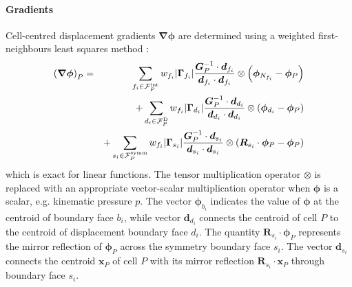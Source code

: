 \documentclass[sn-mathphys,Numbered]{sn-jnl}%
\newcommand{\bb}{\boldsymbol}
\begin{document}
\paragraph{Gradients}
Cell-centred displacement gradients $\bb{\nabla} \bb{\phi}$ are determined using a weighted first-neighbours least squares method \citep{Cardiff2025JFNK, Jasak1996}:
\begin{eqnarray} \label{eq:leastSquaresGrad}
	\left(\bb{\nabla}\bb{\phi}\right)_P
		&=&\sum_{f_i \in \mathcal{F}^{\text{int}}_P} w_{f_i} |\bb{\Gamma}_{f_i}| \frac{\bb{G}^{-1}_P \cdot \bb{d}_{f_i}}{\bb{d}_{f_i} \cdot \bb{d}_{f_i}}  \otimes \left(\bb{\phi}_{N_{f_i}} - \bb{\phi}_P \right) \notag \\
		&&+ \sum_{d_i \in \mathcal{F}^{\text{D}}_P} w_{f_i} |\bb{\Gamma}_{d_i}| \frac{ \bb{G}^{-1}_P \cdot \bb{d}_{d_i} }{\bb{d}_{d_i} \cdot \bb{d}_{d_i}} \otimes \left(\bb{\phi}_{d_i} - \bb{\phi}_P \right) \notag \\
		&&+ \sum_{s_i \in \mathcal{F}^{\text{symm}}_P} w_{f_i} |\bb{\Gamma}_{s_i}| \frac{\bb{G}^{-1}_P \cdot \bb{d}_{s_i}}{\bb{d}_{s_i} \cdot \bb{d}_{s_i}} \otimes \left(\bb{R}_{s_i} \cdot \bb{\phi}_P - \bb{\phi}_P \right)
\end{eqnarray}
which is exact for linear functions.
The tensor multiplication operator $\otimes$ is replaced with an appropriate vector-scalar multiplication operator when $\bb{\phi}$ is a scalar, e.g. kinematic pressure $p$.
The vector $\bb{\phi}_{b_i}$ indicates the value of $\bb{\phi}$ at the centroid of boundary face ${b_i}$, while vector $\bb{d}_{d_i}$ connects the centroid of cell $P$ to the centroid of displacement boundary face $d_i$.
The quantity $\bb{R}_{s_i} \cdot \bb{\phi}_P$ represents the mirror reflection of $\bb{\phi}_P$ across the symmetry boundary face $s_i$.
The vector $\bb{d}_{s_i}$ connects the centroid $\bb{x}_P$ of cell $P$ with its mirror reflection $\bb{R}_{s_i}  \cdot \bb{x}_P$ through boundary face $s_i$.
\end{document}
